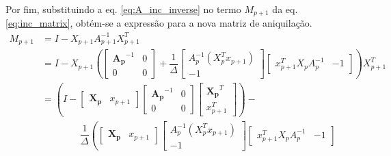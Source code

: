 Por fim, substituindo a eq. \ref{eq:A_inc_inverse} no termo $M_{p+1}$ da eq. \ref{eq:inc_matrix}, obtém-se a expressão para a nova matriz de aniquilação.
\smallskip
\begin{equation}
    \begin{split}
        M_{p+1} &= I - X_{p+1} A_{p+1}^{-1} X_{p+1}^T \\ 
                &=  I - X_{p+1} \left(
                \begin{bmatrix} 
                    \mathbf{A_p}^{-1} & 0 \\ 
                    0 & 0 
                \end{bmatrix} + \dfrac{1}{\Delta}
                \begin{bmatrix} 
                    A_p^{-1} (X_p^T x_{p+1}) \\ 
                    -1 
                \end{bmatrix}
                \begin{bmatrix} 
                    x_{p+1}^T X_p A_p^{-1} & -1           
                \end{bmatrix}\right) X_{p+1}^T \\
                &= \left( I - 
                \begin{bmatrix} 
                    \mathbf{X_p} & x_{p+1}
                \end{bmatrix}
                \begin{bmatrix} 
                    \mathbf{A_p}^{-1} & 0 \\ 
                    0 & 0 
                \end{bmatrix}
                \begin{bmatrix} 
                    \mathbf{X_p}^T \\ 
                    x_{p+1}^T
                \end{bmatrix} \right) - \\ &\qquad \qquad \dfrac{1}{\Delta} \left(
                \begin{bmatrix} 
                    \mathbf{X_p} & x_{p+1}
                \end{bmatrix}
                \begin{bmatrix} 
                    A_p^{-1} (X_p^T x_{p+1}) \\
                    -1 
                \end{bmatrix}
                \begin{bmatrix} 
                    x_{p+1}^T X_p A_p^{-1} & -1           

\end{bmatrix}
\end{split}
\end{equation}
